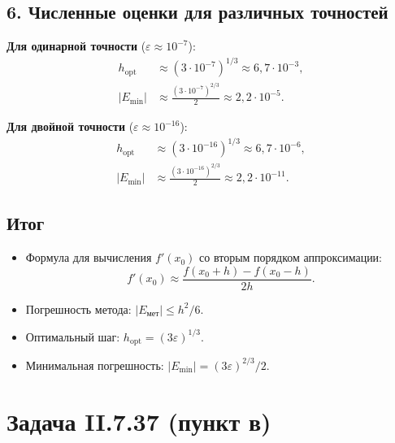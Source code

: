 \documentclass{article}
\begin{document}
\subsection*{6. Численные оценки для различных точностей}

\textbf{Для одинарной точности} ($\varepsilon \approx 10^{-7}$):
\begin{align}
h_{\text{opt}} &\approx (3 \cdot 10^{-7})^{1/3} \approx 6,7 \cdot 10^{-3}, \\
|E_{\text{min}}| &\approx \frac{(3 \cdot 10^{-7})^{2/3}}{2} \approx 2,2 \cdot 10^{-5}.
\end{align}

\textbf{Для двойной точности} ($\varepsilon \approx 10^{-16}$):
\begin{align}
h_{\text{opt}} &\approx (3 \cdot 10^{-16})^{1/3} \approx 6,7 \cdot 10^{-6}, \\
|E_{\text{min}}| &\approx \frac{(3 \cdot 10^{-16})^{2/3}}{2} \approx 2,2 \cdot 10^{-11}.
\end{align}

\subsection*{Итог}

\begin{itemize}
\item Формула для вычисления $f'(x_0)$ со вторым порядком аппроксимации:
\begin{equation}
f'(x_0) \approx \frac{f(x_0 + h) - f(x_0 - h)}{2h}.
\end{equation}

\item Погрешность метода: $|E_{\text{мет}}| \leq h^2/6$.

\item Оптимальный шаг: $h_{\text{opt}} = (3\varepsilon)^{1/3}$.

\item Минимальная погрешность: $|E_{\text{min}}| = (3\varepsilon)^{2/3}/2$.
\end{itemize}














\section*{Задача II.7.37 (пункт в)}
\end{document}
